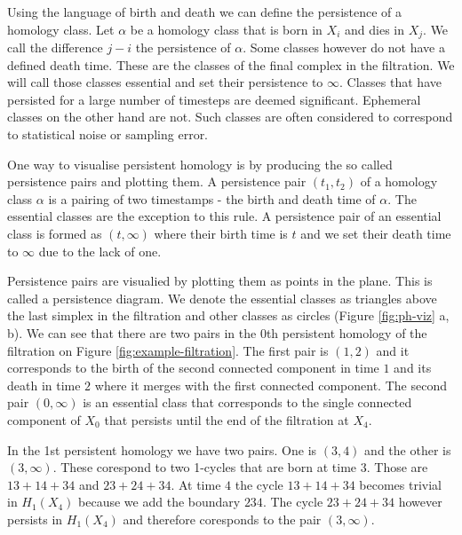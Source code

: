 Using the language of birth and death we can define the persistence of a homology class. Let $\alpha$ be a homology class that is born in $X_i$ and dies in $X_j$. We call the difference $j - i$ the persistence of $\alpha$. Some classes however do not have a defined death time. These are the classes of the final complex in the filtration. We will call those classes essential and set their persistence to $\infty$. Classes that have persisted for a large number of timesteps are deemed significant. Ephemeral classes on the other hand are not. Such classes are often considered to correspond to statistical noise or sampling error.


One way to visualise persistent homology is by producing the so called persistence pairs and plotting them. A persistence pair $(t_1, t_2)$ of a homology class $\alpha$ is a pairing of two timestamps - the birth and death time of $\alpha$. The essential classes are the exception to this rule. A persistence pair of an essential class is formed as $(t, \infty)$ where their birth time is $t$ and we set their death time to $\infty$ due to the lack of one.

Persistence pairs are visualied by plotting them as points in the plane. This is called a persistence diagram. We denote the essential classes as triangles above the last simplex in the filtration and other classes as circles (Figure \ref{fig:ph-viz} a, b). We can see that there are two pairs in the 0th persistent homology of the filtration on Figure \ref{fig:example-filtration}. The first pair is $(1, 2)$ and it corresponds to the birth of the second connected component in time $1$ and its death in time $2$ where it merges with the first connected component. The second pair $(0, \infty)$ is an essential class that corresponds to the single connected component of $X_0$ that persists until the end of the filtration at $X_4$.

In the 1st persistent homology we have two pairs. One is $(3, 4)$ and the other is $(3, \infty)$. These corespond to two 1-cycles that are born at time $3$. Those are $13 + 14 + 34$ and $23 + 24 + 34$. At time $4$ the cycle $13 + 14 + 34$ becomes trivial in $H_1(X_4)$ because we add the boundary $234$. The cycle $23 + 24 + 34$ however persists in $H_1(X_4)$ and therefore coresponds to the pair $(3, \infty)$.

